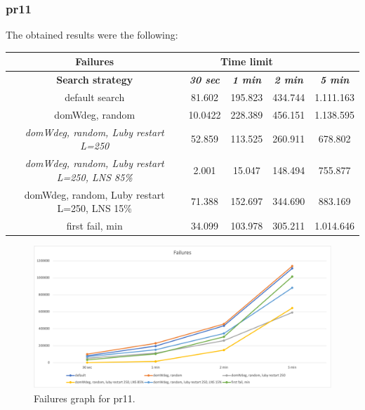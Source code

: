 \subsubsection{pr11}
The obtained results were the following:
{
\renewcommand{\arraystretch}{2}
\begin{longtable}[h]{| c | c | c | c | c |}
    \hline
    \textbf{Failures} & \multicolumn{3}{c}{Time limit} & \\
    \hline
    \textbf{Search strategy} & \textbf{\textit{30 sec}} & \textbf{\textit{1 min}} & \textbf{\textit{2 min}} & \textbf{\textit{5 min}} \\
    \hline
    \endhead
    default search                                         &  81.602 & 195.823 & 434.744 & 1.111.163 \\
    \hline
    domWdeg, random                                        & 10.0422 & 228.389 & 456.151 & 1.138.595 \\
    \hline
    \textit{domWdeg, random, Luby restart L=250}           &  52.859 & 113.525 & 260.911 &  678.802 \\
    \hline
    \textit{domWdeg, random, Luby restart L=250, LNS 85\%} &   2.001 &  15.047 & 148.494 &  755.877 \\
    \hline
    domWdeg, random, Luby restart L=250, LNS 15\%          &  71.388 & 152.697 & 344.690 &  883.169 \\
    \hline
    first fail, min                                        &  34.099 & 103.978 & 305.211 & 1.014.646 \\
    \hline
\end{longtable}
}
\begin{figure}[H]
    \centering
    \includegraphics[width=1.0\columnwidth]{../graphs/pr11-failures.png}
    \caption{Failures graph for pr11.}
\end{figure}

